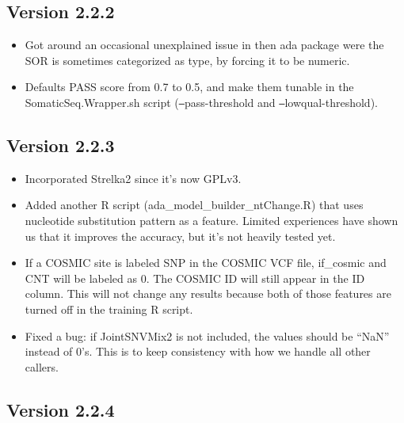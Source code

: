 \documentclass[10pt,letterpaper]{article}
\begin{document}
\begin{sloppypar}
\subsection{Version 2.2.2}

\begin{itemize}

  \item
  Got around an occasional unexplained issue in then ada package were the SOR is sometimes categorized as type, by forcing it to be numeric. 
  
  \item
  Defaults PASS score from 0.7 to 0.5, and make them tunable in the SomaticSeq.Wrapper.sh script (\texttt{--}pass-threshold and \texttt{--}lowqual-threshold). 
  
\end{itemize}



\subsection{Version 2.2.3}

\begin{itemize}

  \item
  Incorporated Strelka2 since it's now GPLv3.
  
  \item
  Added another R script (ada\_model\_builder\_ntChange.R) that uses nucleotide substitution pattern as a feature. Limited experiences have shown us that it improves the accuracy, but it's not heavily tested yet. 

  \item
  If a COSMIC site is labeled SNP in the COSMIC VCF file, if\_cosmic and CNT will be labeled as 0. The COSMIC ID will still appear in the ID column. This will not change any results because both of those features are turned off in the training R script.
  
  \item
  Fixed a bug: if JointSNVMix2 is not included, the values should be ``NaN'' instead of 0's. This is to keep consistency with how we handle all other callers.
  
\end{itemize}



\subsection{Version 2.2.4}


\end{sloppypar}
\end{document}
